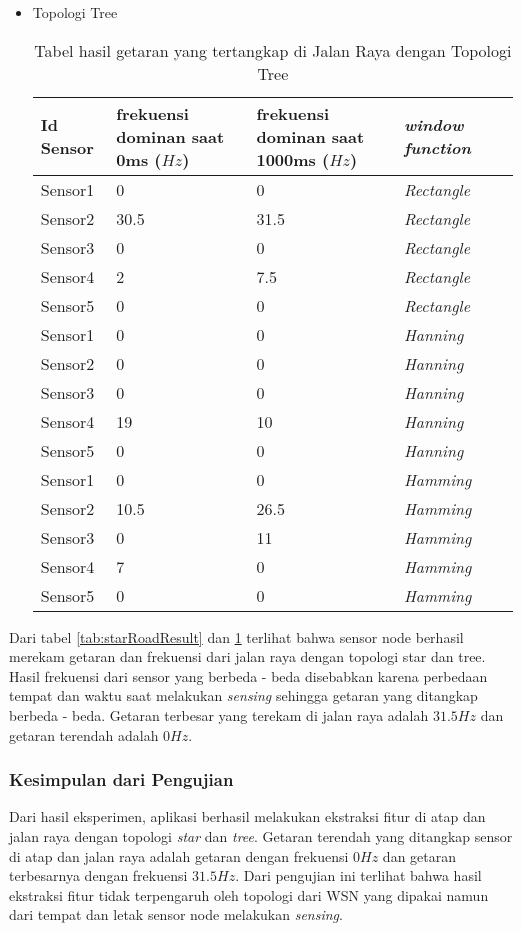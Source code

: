 \begin{itemize}
\item Topologi Tree\\
\begin{table}[H]
    \centering
    \caption{Tabel hasil getaran yang tertangkap di Jalan Raya dengan Topologi Tree}
    \begin{tabular}{|p{3cm}|p{3cm}|p{3cm}|p{3cm}|p{3cm}|}
    \hline Id Sensor & frekuensi dominan saat 0ms ($Hz$)& frekuensi dominan saat 1000ms ($Hz$)& {\it window function}\\
    \hline Sensor1 & 0 & 0 & {\it Rectangle} \\
    \hline Sensor2 & 30.5 & 31.5 & {\it Rectangle} \\
    \hline Sensor3 & 0 & 0 & {\it Rectangle} \\
    \hline Sensor4 & 2 & 7.5 & {\it Rectangle} \\
    \hline Sensor5 & 0 & 0 & {\it Rectangle} \\
    \hline Sensor1 & 0 & 0 & {\it Hanning} \\
    \hline Sensor2 & 0 & 0 & {\it Hanning} \\
    \hline Sensor3 & 0 & 0 & {\it Hanning} \\
    \hline Sensor4 & 19 & 10 & {\it Hanning} \\
    \hline Sensor5 & 0 & 0 & {\it Hanning} \\
    \hline Sensor1 & 0 & 0 & {\it Hamming} \\
    \hline Sensor2 & 10.5 & 26.5 & {\it Hamming} \\
    \hline Sensor3 & 0 & 11 & {\it Hamming} \\
    \hline Sensor4 & 7 & 0 & {\it Hamming} \\
    \hline Sensor5 & 0 & 0 & {\it Hamming} \\
    \hline
    \end{tabular}
    \label{tab:treeRoadResult}
\end{table}
\end{itemize}

Dari tabel \ref{tab:starRoadResult} dan \ref{tab:treeRoadResult} terlihat bahwa sensor node berhasil merekam getaran dan frekuensi dari jalan raya dengan topologi star dan tree. Hasil frekuensi dari sensor yang berbeda - beda disebabkan karena perbedaan tempat dan waktu saat melakukan {\it sensing} sehingga getaran yang ditangkap berbeda - beda. Getaran terbesar yang terekam di jalan raya adalah $31.5Hz$ dan getaran terendah adalah $0Hz$.  

\subsubsection{Kesimpulan dari Pengujian}
Dari hasil eksperimen, aplikasi berhasil melakukan ekstraksi fitur di atap dan jalan raya dengan topologi {\it star} dan {\it tree}. Getaran terendah yang ditangkap sensor di atap dan jalan raya adalah getaran dengan frekuensi $0Hz$ dan getaran terbesarnya dengan frekuensi $31.5Hz$.
Dari pengujian ini terlihat bahwa hasil ekstraksi fitur tidak terpengaruh oleh topologi dari WSN yang dipakai namun dari tempat dan letak sensor node melakukan {\it sensing}.

